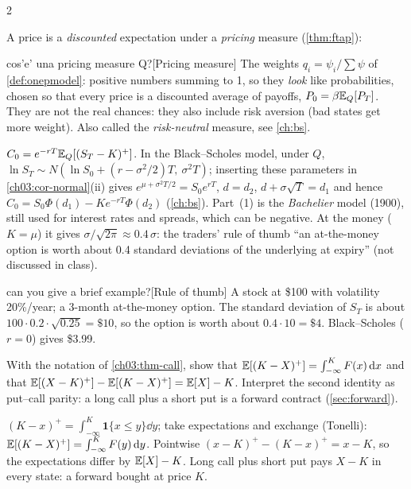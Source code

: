 \begin{paracol}{2}
\begin{finance}
A price is a \emph{discounted} expectation under a \emph{pricing} measure (\cref{thm:ftap}):\begin{answer}{cos'e' una pricing measure Q?}[Pricing measure]\label{ans:pricingQ}
The weights $q_i=\psi_i/\sum\psi$ of \cref{def:onepmodel}: positive numbers summing to 1, so they
\emph{look} like probabilities, chosen so that every price is a discounted average of payoffs,
$P_0=\beta\mathbb{E}_Q[P_T]$. They are not the real chances: they also include risk aversion (bad states get more
weight). Also called the \emph{risk-neutral} measure, see \cref{ch:bs}.
\end{answer}
$C_0=e^{-rT}\mathbb{E}_Q[(S_T-K)^+]$. In the Black--Scholes model, under $Q$, $\ln S_T\sim N(\ln S_0+(r-\sigma^2/2)T,\
\sigma^2T)$; inserting these parameters in \cref{ch03:cor-normal}(ii) gives $e^{\mu+\sigma^2T/2}=S_0e^{rT}$, $d=d_2$,
$d+\sigma\sqrt T=d_1$ and hence $C_0=S_0\Phi(d_1)-Ke^{-rT}\Phi(d_2)$ (\cref{ch:bs}). Part~(1) is the
\emph{Bachelier} model (1900), still used for interest rates and spreads, which can be negative. At the
money ($K=\mu$) it gives $\sigma/\sqrt{2\pi}\approx0.4\,\sigma$: the traders' rule of thumb ``an at-the-money
option is worth about 0.4 standard deviations of the underlying at expiry'' (not discussed in class).\begin{answer}{can you give a brief example?}[Rule of thumb]
A stock at \$100 with volatility 20\%/year; a 3-month at-the-money option. The standard deviation of $S_T$
is about $100\cdot0.2\cdot\sqrt{0.25}=\$10$, so the option is worth about $0.4\cdot10=\$4$. Black--Scholes
($r=0$) gives \$3.99.
\end{answer}
\end{finance}

\begin{exercise}\label{ch03:ex-parity}
With the notation of \cref{ch03:thm-call}, show that $\mathbb{E}[(K-X)^+]=\int_{-\infty}^KF(x)\,\mathrm{d} x$ and that
$\mathbb{E}[(X-K)^+]-\mathbb{E}[(K-X)^+]=\mathbb{E}[X]-K$. Interpret the second identity as put--call parity: a long call plus a short put is a
forward contract (\cref{sec:forward}).
\end{exercise}
\begin{solution}[ch03:ex-parity]
$(K-x)^+=\int_{-\infty}^K\mathbf 1\{x\le y\}\dd y$; take expectations and exchange (Tonelli): $\mathbb{E}[(K-X)^+]=\int_{-\infty}^K F(y)\,\mathrm{d} y$.
Pointwise $(x-K)^+-(K-x)^+=x-K$, so the expectations differ by $\mathbb{E}[X]-K$. Long call plus short put pays $X-K$ in
every state: a forward bought at price $K$.
\end{solution}


\end{paracol}
